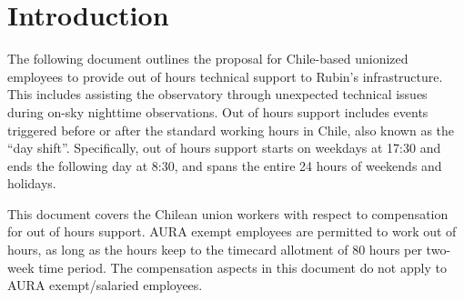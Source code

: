 \section{Introduction}

The following document outlines the proposal for Chile-based unionized employees to provide out of hours technical support to Rubin's infrastructure.
This includes assisting the observatory through unexpected technical issues during on-sky nighttime observations.
Out of hours support includes events triggered before or after the standard working hours in Chile, also known as the ``day shift''.
Specifically, out of hours support starts on weekdays at 17:30 and ends the following day at 8:30, and spans the entire 24 hours of weekends and holidays.

This document covers the Chilean union workers with respect to compensation for out of hours support. 
AURA exempt employees are permitted to work out of hours, as long as the hours keep to the timecard allotment of 80 hours per two-week time period.  
The compensation aspects in this document do not apply to AURA exempt/salaried employees.